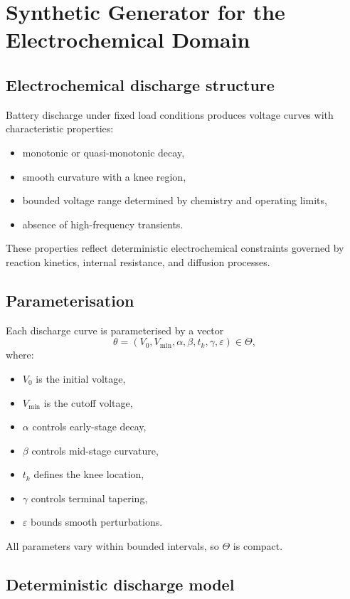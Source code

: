\documentclass[10pt]{article}
\theoremstyle{plain}
\theoremstyle{definition}
\theoremstyle{remark}
\begin{document}
\section{Synthetic Generator for the Electrochemical Domain}
\label{app:gen_battery}
\subsection{Electrochemical discharge structure}

Battery discharge under fixed load conditions produces voltage curves with
characteristic properties:
\begin{itemize}
    \item monotonic or quasi-monotonic decay,
    \item smooth curvature with a knee region,
    \item bounded voltage range determined by chemistry and operating limits,
    \item absence of high-frequency transients.
\end{itemize}

These properties reflect deterministic electrochemical constraints governed by
reaction kinetics, internal resistance, and diffusion processes.

\subsection{Parameterisation}

Each discharge curve is parameterised by a vector
\[
\theta = (V_0, V_{\min}, \alpha, \beta, t_k, \gamma, \varepsilon) \in \Theta,
\]
where:
\begin{itemize}
    \item $V_0$ is the initial voltage,
    \item $V_{\min}$ is the cutoff voltage,
    \item $\alpha$ controls early-stage decay,
    \item $\beta$ controls mid-stage curvature,
    \item $t_k$ defines the knee location,
    \item $\gamma$ controls terminal tapering,
    \item $\varepsilon$ bounds smooth perturbations.
\end{itemize}

All parameters vary within bounded intervals, so $\Theta$ is compact.

\subsection{Deterministic discharge model}
\end{document}
